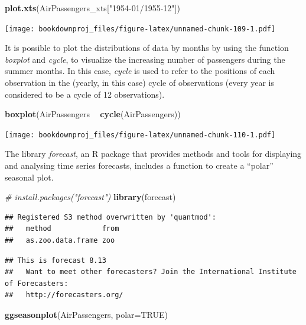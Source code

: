 \documentclass[
]{article}
\newenvironment{Shaded}{\begin{snugshade}}{\end{snugshade}}
\newcommand{\CommentTok}[1]{\textcolor[rgb]{0.56,0.35,0.01}{\textit{#1}}}
\newcommand{\DataTypeTok}[1]{\textcolor[rgb]{0.13,0.29,0.53}{#1}}
\newcommand{\KeywordTok}[1]{\textcolor[rgb]{0.13,0.29,0.53}{\textbf{#1}}}
\newcommand{\NormalTok}[1]{#1}
\newcommand{\OperatorTok}[1]{\textcolor[rgb]{0.81,0.36,0.00}{\textbf{#1}}}
\newcommand{\OtherTok}[1]{\textcolor[rgb]{0.56,0.35,0.01}{#1}}
\newcommand{\StringTok}[1]{\textcolor[rgb]{0.31,0.60,0.02}{#1}}
\begin{document}
\begin{Shaded}
\begin{Highlighting}[]
\KeywordTok{plot.xts}\NormalTok{(AirPassengers_xts[}\StringTok{"1954-01/1955-12"}\NormalTok{])}
\end{Highlighting}
\end{Shaded}

\texttt{[image: bookdownproj\_files/figure-latex/unnamed-chunk-109-1.pdf]}

It is possible to plot the distributions of data by months by using the function \emph{boxplot} and \emph{cycle}, to visualize the increasing number of passengers during the summer months. In this case, \emph{cycle} is used to refer to the positions of each observation in the (yearly, in this case) cycle of observations (every year is considered to be a cycle of 12 observations).

\begin{Shaded}
\begin{Highlighting}[]
\KeywordTok{boxplot}\NormalTok{(AirPassengers }\OperatorTok{~}\StringTok{ }\KeywordTok{cycle}\NormalTok{(AirPassengers))}
\end{Highlighting}
\end{Shaded}

\texttt{[image: bookdownproj\_files/figure-latex/unnamed-chunk-110-1.pdf]}

The library \emph{forecast}, an R package that provides methods and tools for displaying and analysing time series forecasts, includes a function to create a ``polar'' seasonal plot.

\begin{Shaded}
\begin{Highlighting}[]
\CommentTok{# install.packages("forecast")}
\KeywordTok{library}\NormalTok{(forecast)}
\end{Highlighting}
\end{Shaded}

\begin{verbatim}
## Registered S3 method overwritten by 'quantmod':
##   method            from
##   as.zoo.data.frame zoo
\end{verbatim}

\begin{verbatim}
## This is forecast 8.13 
##   Want to meet other forecasters? Join the International Institute of Forecasters:
##   http://forecasters.org/
\end{verbatim}

\begin{Shaded}
\begin{Highlighting}[]
\KeywordTok{ggseasonplot}\NormalTok{(AirPassengers, }\DataTypeTok{polar=}\OtherTok{TRUE}\NormalTok{)}
\end{Highlighting}
\end{Shaded}
\end{document}
